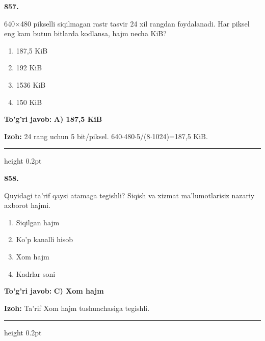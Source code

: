 \documentclass[10pt,a4paper,oneside]{article}
\begin{document}
\noindent\textbf{\color{ink}857.}
\par
640\ensuremath{\times}480 pikselli siqilmagan rastr tasvir 24 xil rangdan foydalanadi. Har piksel eng kam butun bitlarda kodlansa, hajm necha KiB?
\begin{enumerate}[label=\Alph*),leftmargin=9mm]
\item 187,5 KiB
\item 192 KiB
\item 1536 KiB
\item 150 KiB
\end{enumerate}
\begin{tcolorbox}[enhanced,breakable,colback=teal!4,colframe=teal!50!black,boxrule=0.5pt,arc=1.1mm,left=3mm,right=3mm,top=1.7mm,bottom=1.7mm,before skip=2mm,after skip=2mm]
\textbf{\color{teal}To'g'ri javob:} \textbf{A) 187,5 KiB}
\par\smallskip
\textbf{Izoh:} 24 rang uchun 5 bit/piksel. 640\ensuremath{\cdot}480\ensuremath{\cdot}5/(8\ensuremath{\cdot}1024)=187,5 KiB.
\end{tcolorbox}
\vspace{2mm}\hrule height 0.2pt \vspace{3mm}

\noindent\textbf{\color{ink}858.}
\par
Quyidagi ta'rif qaysi atamaga tegishli? Siqish va xizmat ma'lumotlarisiz nazariy axborot hajmi.
\begin{enumerate}[label=\Alph*),leftmargin=9mm]
\item Siqilgan hajm
\item Ko'p kanalli hisob
\item Xom hajm
\item Kadrlar soni
\end{enumerate}
\begin{tcolorbox}[enhanced,breakable,colback=teal!4,colframe=teal!50!black,boxrule=0.5pt,arc=1.1mm,left=3mm,right=3mm,top=1.7mm,bottom=1.7mm,before skip=2mm,after skip=2mm]
\textbf{\color{teal}To'g'ri javob:} \textbf{C) Xom hajm}
\par\smallskip
\textbf{Izoh:} Ta'rif Xom hajm tushunchasiga tegishli.
\end{tcolorbox}
\vspace{2mm}\hrule height 0.2pt \vspace{3mm}
\end{document}
